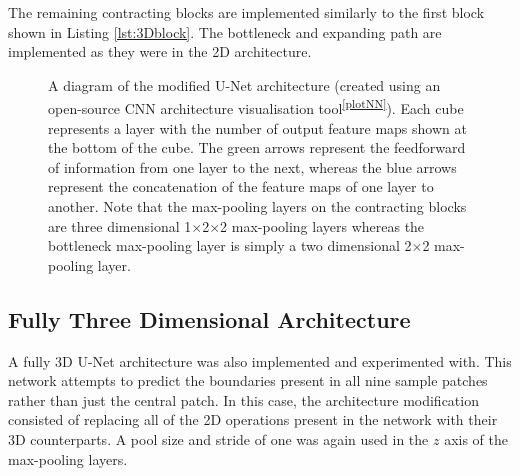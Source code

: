 The remaining contracting blocks are implemented similarly to the first block shown in Listing \ref{lst:3Dblock}. The bottleneck and expanding path are implemented as they were in the 2D architecture.

\begin{figure}[!t]
    \centering
    \hspace*{-0.3cm}
    
    \caption[A diagram of the modified U-Net architecture (created using an open-source CNN architecture visualisation tool). Each cube represents a layer with the number of output feature maps shown at the bottom of the cube. The green arrows represent the feedforward of information from one layer to the next, whereas the blue arrows represent the concatenation of the feature maps of one layer to another.]{A diagram of the modified U-Net architecture (created using an open-source CNN architecture visualisation tool\textsuperscript{\ref{plotNN}}). Each cube represents a layer with the number of output feature maps shown at the bottom of the cube. The green arrows represent the feedforward of information from one layer to the next, whereas the blue arrows represent the concatenation of the feature maps of one layer to another. Note that the max-pooling layers on the contracting blocks are three dimensional 1$\times$2$\times$2 max-pooling layers whereas the bottleneck max-pooling layer is simply a two dimensional 2$\times$2 max-pooling layer.}
    \label{fig:unetushape3D}
\end{figure}



\subsection{Fully Three Dimensional Architecture}

A fully 3D U-Net architecture was also implemented and experimented with. This network attempts to predict the boundaries present in all nine sample patches rather than just the central patch. In this case, the architecture modification consisted of replacing all of the 2D operations present in the network with their 3D counterparts. A pool size and stride of one was again used in the $z$ axis of the max-pooling layers.

